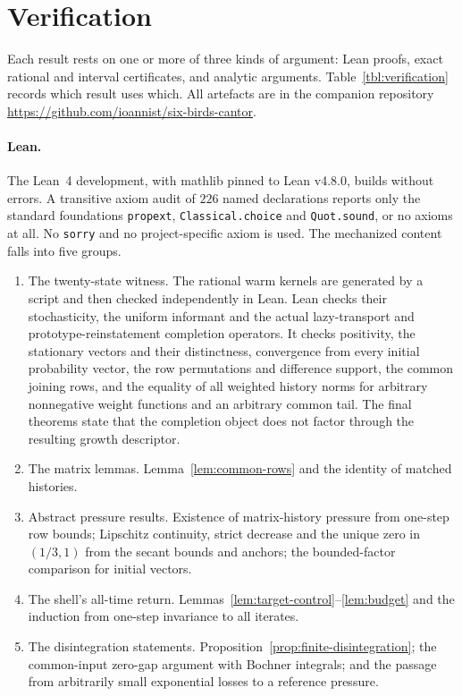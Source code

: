 \section{Verification}\label{sec:verification}

Each result rests on one or more of three kinds of argument: Lean proofs, exact rational and interval certificates, and analytic arguments. Table~\ref{tbl:verification} records which result uses which. All artefacts are in the companion repository \url{https://github.com/ioannist/six-birds-cantor}.

\paragraph{Lean.}
The Lean~4 development, with mathlib \cite{deMouraUllrich2021Lean4,mathlib2020} pinned to Lean v4.8.0, builds without errors. A transitive axiom audit of $226$ named declarations reports only the standard foundations \texttt{propext}, \texttt{Classical.choice} and \texttt{Quot.sound}, or no axioms at all. No \texttt{sorry} and no project-specific axiom is used. The mechanized content falls into five groups.
\begin{enumerate}
  \item The twenty-state witness. The rational warm kernels are generated by a script and then checked independently in Lean. Lean checks their stochasticity, the uniform informant and the actual lazy-transport and prototype-reinstatement completion operators. It checks positivity, the stationary vectors and their distinctness, convergence from every initial probability vector, the row permutations and difference support, the common joining rows, and the equality of all weighted history norms for arbitrary nonnegative weight functions and an arbitrary common tail. The final theorems state that the completion object does not factor through the resulting growth descriptor.
  \item The matrix lemmas. Lemma~\ref{lem:common-rows} and the identity of matched histories.
  \item Abstract pressure results. Existence of matrix-history pressure from one-step row bounds; Lipschitz continuity, strict decrease and the unique zero in $(1/3,1)$ from the secant bounds and anchors; the bounded-factor comparison for initial vectors.
  \item The shell's all-time return. Lemmas~\ref{lem:target-control}--\ref{lem:budget} and the induction from one-step invariance to all iterates.
  \item The disintegration statements. Proposition~\ref{prop:finite-disintegration}; the common-input zero-gap argument with Bochner integrals; and the passage from arbitrarily small exponential losses to a reference pressure.
\end{enumerate}

